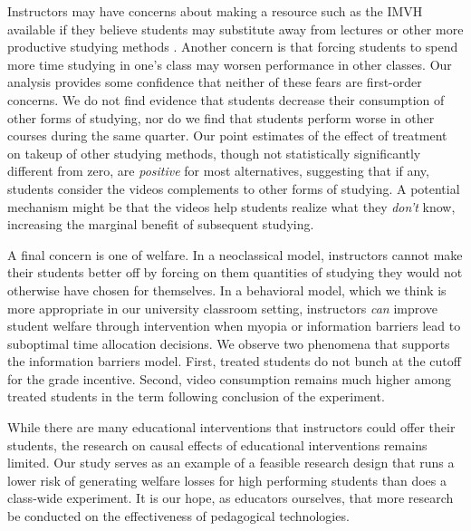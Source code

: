 \documentclass[12pt]{article}
\begin{document}
Instructors may have concerns about making a resource such as the IMVH available if they believe students may substitute away from lectures or other more productive studying methods \textcite{kay2012}. Another concern is that forcing students to spend more time studying in one's class may worsen performance in other classes. Our analysis provides some confidence that neither of these fears are first-order concerns. We do not find evidence that students decrease their consumption of other forms of studying, nor do we find that students perform worse in other courses during the same quarter. Our point estimates of the effect of treatment on takeup of other studying methods, though not statistically significantly different from zero, are \textit{positive} for most alternatives, suggesting that if any, students consider the videos complements to other forms of studying. A potential mechanism might be that the videos help students realize what they \textit{don't} know, increasing the marginal benefit of subsequent studying.

A final concern is one of welfare. In a neoclassical model, instructors cannot make their students better off by forcing on them quantities of studying they would not otherwise have chosen for themselves. In a behavioral model, which we think is more appropriate in our university classroom setting, instructors \textit{can} improve student welfare through intervention when myopia or information barriers lead to suboptimal time allocation decisions. We observe two phenomena that supports the information barriers model. First, treated students do not bunch at the cutoff for the grade incentive. Second, video consumption remains much higher among treated students in the term following conclusion of the experiment.

While there are many educational interventions that instructors could offer their students, the research on causal effects of educational interventions remains limited. Our study serves as an example of a feasible research design that runs a lower risk of generating welfare losses for high performing students than does a class-wide experiment. It is our hope, as educators ourselves, that more research be conducted on the effectiveness of pedagogical technologies.

\printbibliography


\clearpage


\clearpage

\end{document}
